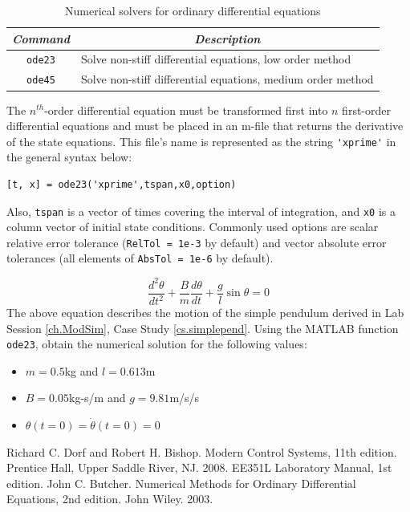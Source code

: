 \begin{table}[bht]
\centering
\renewcommand{\arraystretch}{1.2}
\begin{tabular}{c|p{}}
    \textit{Command}& \multicolumn{1}{c}{\textit{Description}}\\ \hline \hline
    \verb=ode23=        &   Solve non-stiff differential equations,
                                low order method \\
    \verb=ode45=        &   Solve non-stiff differential equations,
                                medium order method
\end{tabular}
\caption{\footnotesize
        Numerical solvers for ordinary differential equations
        \label{tab.odesolvers}
        }
\end{table}
\par
The $n^{th}$-order differential equation must be transformed first into $n$ first-order differential equations and must be placed in an m-file that returns the derivative of the state equations.  This file's name is represented as the string \verb='xprime'= in the general syntax below:
\begin{verbatim}
[t, x] = ode23('xprime',tspan,x0,option)
\end{verbatim}
Also, \verb=tspan= is a vector of times covering the interval of integration, and \verb=x0= is a column vector of initial state conditions.  Commonly used options are scalar relative error tolerance (\verb#RelTol = 1e-3# by default) and vector absolute error tolerances (all elements of \verb#AbsTol = 1e-6# by default).

\begin{workex}  \label{ex.ode23}
\begin{equation*}
    \frac{d^2\theta}{dt^2} + \frac{B}{m} \frac{d\theta}{dt} +
        \frac{g}{l} \sin \theta = 0
\end{equation*}
The above equation describes the motion of the simple pendulum derived in Lab Session \ref{ch.ModSim}, Case Study \ref{cs.simplepend}.  Using the MATLAB function \verb=ode23=, obtain the numerical solution for the following values:
\begin{itemize}
    \item $m = 0.5$kg and $l = 0.613$m
    \item $B = 0.05$kg-s/m and $g = 9.81$m/s/s
    \item $\theta(t=0) = \dot{\theta}(t=0) = 0$
\end{itemize}

\end{workex}


\begin{thebibliography}{9}
     Richard C. Dorf and Robert H. Bishop.  Modern Control Systems, 11th edition.  Prentice Hall, Upper Saddle River, NJ.  2008.
     EE351L Laboratory Manual, 1st edition.
     John C. Butcher.  Numerical Methods for Ordinary Differential Equations, 2nd edition.  John Wiley.  2003.
\end{thebibliography}
